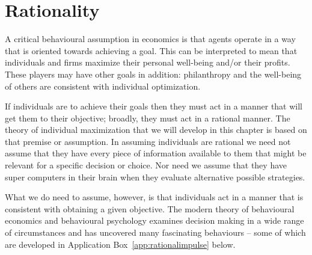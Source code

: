 \section{Rationality}\label{sec:ch6sec1}

A critical behavioural assumption in economics is that agents operate in a way that is oriented towards achieving a goal. This can be interpreted to mean that individuals and firms maximize their personal well-being and/or their profits. These players may have other goals in addition: philanthropy and the well-being of others are consistent with individual optimization.

If individuals are to achieve their goals then they must act in a manner that will get them to their objective; broadly, they must act in a rational manner. The theory of individual maximization that we will develop in this chapter is based on that premise or assumption. In assuming individuals are rational we need not assume that they have every piece of information available to them that might be relevant for a specific decision or choice. Nor need we assume that they have super computers in their brain when they evaluate alternative possible strategies.

What we do need to assume, however, is that individuals act in a manner that is consistent with obtaining a given objective. The modern theory of behavioural economics and behavioural psychology examines decision making in a wide range of circumstances and has uncovered many fascinating behaviours -- some of which are developed in Application Box~\ref{app:rationalimpulse} below.

